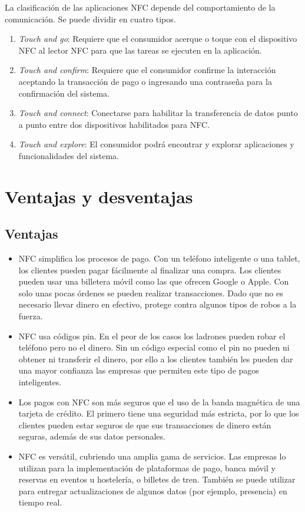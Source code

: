 \documentclass[12pt,a4paper,onecolumn,oneside]{report}
\begin{document}
La clasificación de las aplicaciones NFC depende del comportamiento de la comunicación. Se puede dividir en cuatro tipos.

\begin{enumerate}

\item \textit{Touch and go}: Requiere que el consumidor acerque o toque con el dispositivo NFC al lector NFC para que las tareas se ejecuten en la aplicación. 
\item \textit{Touch and confirm}: Requiere que el consumidor confirme la interacción aceptando la transacción de pago o ingresando una contraseña para la confirmación del sistema.
\item \textit{Touch and connect}: Conectarse para habilitar la transferencia de datos punto a punto entre dos dispositivos habilitados para NFC. 
\item \textit{Touch and explore}: El consumidor podrá encontrar y explorar aplicaciones y funcionalidades del sistema.

\end{enumerate}


\section{Ventajas y desventajas}
\label{Ventajas y desventajas}


\subsection{Ventajas}
\begin{itemize}
\item NFC simplifica los procesos de pago. Con un teléfono inteligente o una tablet, los clientes pueden pagar fácilmente al finalizar una compra. Los clientes pueden usar una billetera móvil como las que ofrecen Google o Apple. Con solo unas pocas órdenes se pueden realizar transacciones. Dado que no es necesario llevar dinero en efectivo, protege contra algunos tipos de robos a la fuerza.
\item NFC usa códigos pin. En el peor de los casos los ladrones pueden robar el teléfono pero no el dinero. Sin un código especial como el pin no pueden ni obtener ni transferir el dinero, por ello a los clientes también les pueden dar una mayor confianza las empresas que permiten este tipo de pagos inteligentes.
\item Los pagos con NFC son más seguros que el uso de la banda magnética de una tarjeta de crédito. El primero tiene una seguridad más estricta, por lo que los clientes pueden estar seguros de que sus transacciones de dinero están seguras, además de sus datos personales.
\item NFC es versátil, cubriendo una amplia gama de servicios. Las empresas lo utilizan para la implementación de plataformas de pago, banca móvil y reservas en eventos u hostelería, o billetes de tren. También se puede utilizar para entregar actualizaciones de algunos datos (por ejemplo, presencia) en tiempo real.
\end{itemize}
\end{document}
